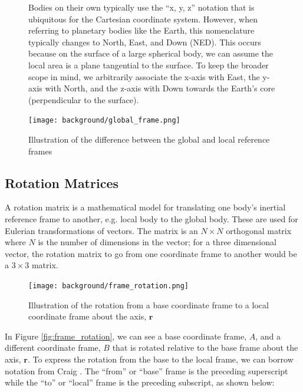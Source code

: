 \begin{figure}
    \begin{fitbox}[frametitle=Aside: Notation and Nomenclature for Rotations]
        Bodies on their own typically use the ``x, y, z'' notation that is ubiquitous for the Cartesian coordinate system.
        However, when referring to planetary bodies like the Earth, this nomenclature typically changes to North, East, and Down (NED).
        This occurs because on the surface of a large spherical body, we can assume the local area is a plane tangential to the surface.
        To keep the broader scope in mind, we arbitrarily associate the x-axis with East, the y-axis with North, and the z-axis with Down towards the Earth's core (perpendicular to the surface).

        \caption{Illustration of the difference between the global and local reference frames}
        \centering
        \texttt{[image: background/global\_frame.png]}
    \end{fitbox}
\end{figure}

\subsection{Rotation Matrices} 
A rotation matrix is a mathematical model for translating one body's inertial reference frame to another, e.g. local body to the global body.
These are used for Eulerian transformations of vectors.
The matrix is an $N \times N$ orthogonal matrix where $N$ is the number of dimensions in the vector;
for a three dimensional vector, the rotation matrix to go from one coordinate frame to another would be a $3 \times 3$ matrix.

\begin{figure}[h!]
    \caption[Illustration of rotation between coordinates frame about an axis]{Illustration of the rotation from a base coordinate frame to a local coordinate frame about the axis, $\pmb{r}$}
    \centering
    \texttt{[image: background/frame\_rotation.png]}
\end{figure}

In Figure \ref{fig:frame_rotation}, we can see a base coordinate frame, $A$, and a different coordinate frame, $B$ that is rotated relative to the base frame about the axis, $\pmb{r}$.
To express the rotation from the base to the local frame, we can borrow notation from Craig \cite{Craig:2022}.
The ``from'' or ``base'' frame is the preceding superscript while the ``to'' or ``local'' frame is the preceding subscript, as shown below:

